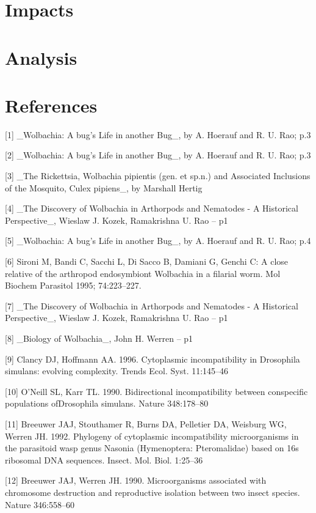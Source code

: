 \documentclass[twocolumn]{article}
\begin{document}
\section*{Impacts}

\section*{Analysis}

\section*{References}
[1] \_Wolbachia: A bug's Life in another Bug\_, by A. Hoerauf and R. U. Rao;  p.3 

[2] \_Wolbachia: A bug's Life in another Bug\_, by A. Hoerauf and R. U. Rao;  p.3

[3] \_The Rickettsia, Wolbachia pipientis (gen. et sp.n.) and Associated Inclusions of the Mosquito, Culex pipiens\_, by Marshall Hertig

[4] \_The Discovery of Wolbachia in Arthorpods and Nematodes - A Historical Perspective\_, Wieslaw J. Kozek, Ramakrishna U. Rao  -- p1

[5] \_Wolbachia: A bug's Life in another Bug\_, by A. Hoerauf and R. U. Rao;  p.4

[6] Sironi M, Bandi C, Sacchi L, Di Sacco B, Damiani G, Genchi C: A close relative of the arthropod endosymbiont Wolbachia in a filarial worm. Mol Biochem Parasitol 1995; 74:223–227.

[7] \_The Discovery of Wolbachia in Arthorpods and Nematodes - A Historical Perspective\_, Wieslaw J. Kozek, Ramakrishna U. Rao  -- p1

[8] \_Biology of Wolbachia\_, John H. Werren  -- p1

[9] Clancy DJ, Hoffmann AA. 1996. Cytoplasmic incompatibility in Drosophila simulans: evolving complexity. Trends Ecol. Syst. 11:145–46

[10] O’Neill SL, Karr TL. 1990. Bidirectional incompatibility between conspecific populations ofDrosophila simulans. Nature 348:178–80

[11] Breeuwer JAJ, Stouthamer R, Burns DA, Pelletier DA, Weisburg WG, Werren JH. 1992. Phylogeny of cytoplasmic incompatibility microorganisms in the parasitoid wasp genus Nasonia (Hymenoptera: Pteromalidae) based on 16s ribosomal DNA sequences. Insect. Mol. Biol. 1:25–36

[12] Breeuwer JAJ, Werren JH. 1990. Microorganisms associated with chromosome destruction and reproductive isolation between two insect species. Nature 346:558–60
\end{document}
